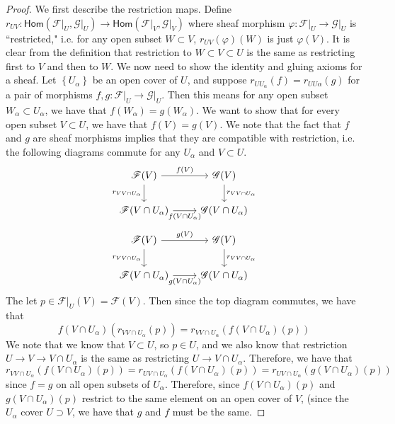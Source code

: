 \documentclass[psamsfonts]{amsart}
\theoremstyle{definition}
\theoremstyle{remark}
\renewcommand{\hom}{\mathsf{Hom}}
\newcommand{\set}[1]{\left\lbrace #1 \right\rbrace}
\begin{document}
%
\begin{proof}
We first describe the restriction maps. Define $r_{UV} : \hom(\mathscr{F}\vert_U, \mathscr{G}\vert_U) \to \hom(\mathscr{F}\vert_V, \mathscr{G}\vert_V)$ where sheaf morphism $\varphi : \mathscr{F}\vert_U \to \mathscr{G}\vert_U$  is ``restricted," i.e. for any open subset $W \subset V$, $r_{UV}(\varphi)(W)$ is just $\varphi(V)$. It is clear from the definition that restriction to $W \subset V \subset U$ is the same as restricting first to $V$ and then to $W$. We now need to show the identity and gluing axioms for a sheaf. Let $\set{U_\alpha}$ be an open cover of $U$, and suppose $r_{UU_\alpha}(f) = r_{UU\alpha}(g)$ for a pair of morphisms $f,g : \mathscr{F}\vert_U \to \mathscr{G}\vert_U$. Then this means for any open subset $W_\alpha \subset U_\alpha$, we have that $f(W_\alpha) = g(W_\alpha)$. We want to show that for every open subset $V \subset U$, we have that $f(V) = g(V)$. We note that the fact that $f$ and $g$ are sheaf morphisms implies that they are compatible with restriction, i.e. the following diagrams commute for any $U_\alpha$ and $V \subset U$.
$$\begin{tikzcd}
\mathscr{F}(V) \ar[d, "r_{VV\cap U_\alpha}"']\ar[r, "f(V)"] & \mathscr{G}(V) \ar[d, "r_{VV\cap U_\alpha}"] \\
\mathscr{F}(V \cap U_\alpha) \ar[r, "f(V \cap U_\alpha)"'] & \mathscr{G}(V \cap U_\alpha)
\end{tikzcd}$$
$$\begin{tikzcd}
\mathscr{F}(V) \ar[d, "r_{VV\cap U_\alpha}"']\ar[r, "g(V)"] & \mathscr{G}(V) \ar[d, "r_{VV\cap U_\alpha}"] \\
\mathscr{F}(V \cap U_\alpha) \ar[r, "g(V \cap U_\alpha)"'] & \mathscr{G}(V \cap U_\alpha)
\end{tikzcd}$$
The let $p \in \mathscr{F}\vert_U(V) = \mathscr{F}(V)$. Then since the top diagram commutes, we have that 
$$f(V\cap U_\alpha)(r_{VV\cap U_\alpha}(p)) = r_{VV\cap U_\alpha}(f(V\cap U_\alpha)(p)) $$
We note that we know that $V \subset U$, so $p \in U$, and we also know that restriction $U \to V \to V \cap U_\alpha$ is the same as restricting $U \to V \cap U_\alpha$. Therefore, we have that
$$r_{VV\cap U_\alpha}(f(V \cap U_\alpha)(p)) = r_{UV \cap U_\alpha}(f(V\cap U_\alpha)(p)) = r_{UV \cap U_\alpha}(g(V \cap U_\alpha)(p)) $$
since $f = g$ on all open subsets of $U_\alpha$. Therefore, since $f(V \cap U_\alpha)(p)$ and $g(V \cap U_\alpha)(p)$ restrict to the same element on an open cover of $V$, (since the $U_\alpha$ cover $U \supset V$, we have that $g$ and $f$ must be the same.


\end{proof}
\end{document}
